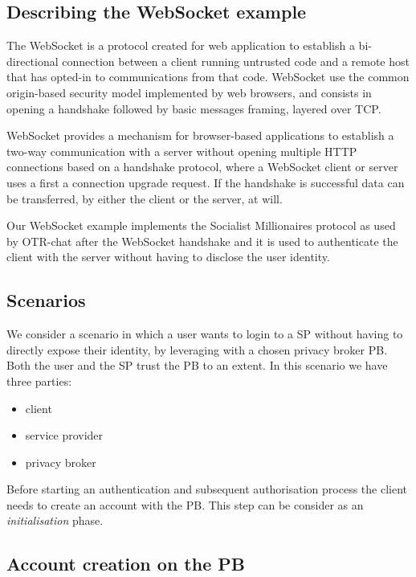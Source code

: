 \subsection{Describing the WebSocket example}

The WebSocket is a protocol created for web application to establish a bi-directional connection between a client running untrusted code and a remote host that has opted-in to communications from that code. 
WebSocket use the common origin-based security model implemented by web browsers, and consists in opening a handshake followed by basic messages framing, layered over TCP.

WebSocket provides a mechanism for browser-based applications to establish a two-way communication with a server without opening multiple HTTP connections based on a handshake protocol, where a WebSocket client or server uses a first a connection upgrade request. If the handshake is successful data can be transferred, by either the client or the server, at will.

Our WebSocket example implements the Socialist Millionaires protocol as used by OTR-chat after the WebSocket handshake and it is used to authenticate the client with the server without having to disclose the user identity.

\subsection{Scenarios}

We consider a scenario in which a user wants to login to a SP without having to directly expose their identity, by leveraging with a chosen privacy broker PB. Both the user and the SP trust the PB to an extent. In this scenario we have three parties:
\begin{itemize}
    \item client
    \item service provider
    \item privacy broker
\end{itemize}

Before starting an authentication and subsequent authorisation process the client needs to create an account with the PB. This step can be consider as an \emph{initialisation} phase.

\subsection{Account creation on the PB}

